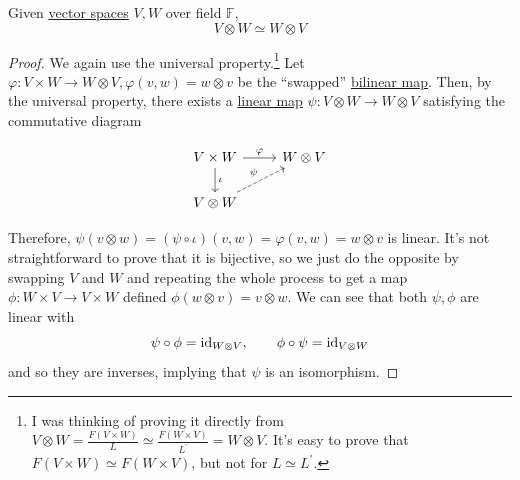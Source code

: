 	\begin{lemma}
	  \label{thm:commutativity-of-tensor-products-on-spaces}
		Given \hyperref[def:vector-space]{vector spaces} $V, W$ over field $\mathbb{F}$, 
		\begin{equation}
		  V \otimes W \simeq W \otimes V
		\end{equation}
	\end{lemma}
	\begin{proof}
		We again use the universal property.\footnote{I was thinking of proving it directly from $V \otimes W = \frac{F(V \times W)}{L} \simeq \frac{F(W \times V)}{L^\prime} = W \otimes V$. It's easy to prove that $F(V \times W) \simeq F(W \times V)$, but not for $L \simeq L^\prime$. } Let $\varphi: V \times W \to W \otimes V, \varphi(v, w) = w \otimes v$ be the ``swapped'' \hyperref[def:bilinear-map]{bilinear map}. Then, by the universal property, there exists a \hyperref[def:linear_map]{linear map} $\psi: V \otimes W \to W \otimes V$ satisfying the commutative diagram  

		\begin{figure}[H]
			\centering 
			\begin{equation}
			  \begin{tikzcd}
			  				V \times W \arrow[r, "\varphi"] \arrow[d, "\iota"] & W \otimes V \\
			  				V \otimes W \arrow[ru, dashed, "\psi"]
			  			\end{tikzcd}
			\end{equation}
			\caption{} 
		\end{figure}

		Therefore, $\psi(v \otimes w) = (\psi \circ \iota)(v, w) = \varphi(v, w) = w \otimes v$ is linear. It's not straightforward to prove that it is bijective, so we just do the opposite by swapping $V$ and $W$ and repeating the whole process to get a map $\phi: W \times V \to V \times W$ defined $\phi(w \otimes v) = v \otimes w$. We can see that both $\psi, \phi$ are linear with 
		\begin{equation}
			\psi \circ \phi = \operatorname{id}_{W \otimes V}, \qquad \phi \circ \psi = \operatorname{id}_{V \otimes W}
		\end{equation}
		and so they are inverses, implying that $\psi$ is an isomorphism. 
	\end{proof}

